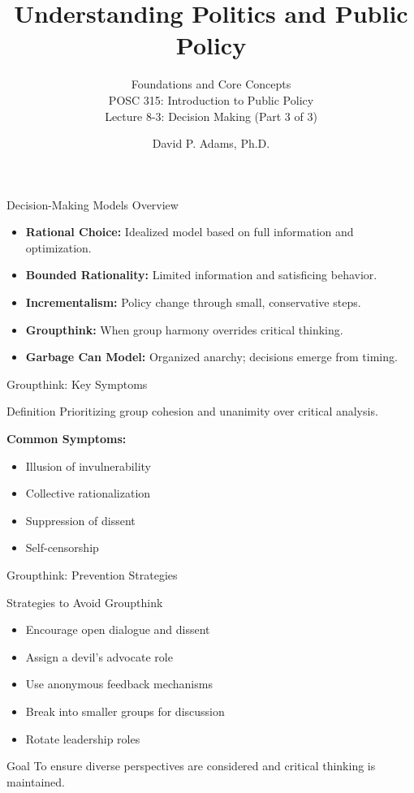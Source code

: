 \documentclass[10pt]{beamer}
\begin{document}
\title{Understanding Politics and Public Policy}
\subtitle{Foundations and Core Concepts \\ POSC 315: Introduction to Public Policy \\ Lecture 8-3: Decision Making (Part 3 of 3)}
\date{David P. Adams, Ph.D.}

\maketitle

\begin{frame}{Decision-Making Models Overview}
\begin{itemize}
  \item \textbf{Rational Choice:} Idealized model based on full information and optimization.
  \item \textbf{Bounded Rationality:} Limited information and satisficing behavior.
  \item \textbf{Incrementalism:} Policy change through small, conservative steps.
  \item \textbf{Groupthink:} When group harmony overrides critical thinking.
  \item \textbf{Garbage Can Model:} Organized anarchy; decisions emerge from timing.
\end{itemize}
\end{frame}

\begin{frame}{Groupthink: Key Symptoms}
\begin{block}{Definition}
Prioritizing group cohesion and unanimity over critical analysis.
\end{block}
\vspace{0.5cm}
\textbf{Common Symptoms:}
\begin{itemize}
  \item Illusion of invulnerability
  \item Collective rationalization
  \item Suppression of dissent
  \item Self-censorship
\end{itemize}
\end{frame}

\begin{frame}{Groupthink: Prevention Strategies}
\begin{block}{Strategies to Avoid Groupthink}
\begin{itemize}
  \item Encourage open dialogue and dissent
  \item Assign a devil's advocate role
  \item Use anonymous feedback mechanisms
  \item Break into smaller groups for discussion
  \item Rotate leadership roles
\end{itemize}
\end{block}
\begin{block}{Goal}
To ensure diverse perspectives are considered and critical thinking is maintained.
\end{block}
\end{frame}   
\end{document}
